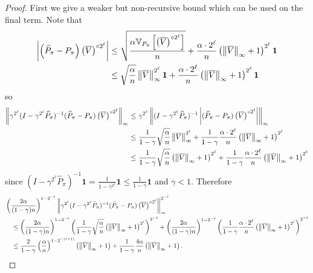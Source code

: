 \documentclass{article}
\theoremstyle{plain}
\theoremstyle{plain}
\theoremstyle{remark}
\theoremstyle{plain}
\theoremstyle{plain}
\newcommand{\Var}{\mathbb{V}}
\newcommand{\Phat}{\widehat{P}}
\newcommand{\one}{\mathbf{1}}
\newcommand{\Vc}{\overline{V}}
\begin{document}
\begin{proof}
    First we give a weaker but non-recursive bound which can be used on the final term. 
Note that
\begin{align*}
        \left| \left(\Phat_{\pi} - P_{\pi}\right) \left( \Vc \right)^{\circ 2^\ell} \right|
    &\leq \sqrt{\frac{\alpha   \Var_{P_{\pi}} \left[ \left(\Vc \right)^{\circ 2^\ell}  \right]    }{n }} + \frac{ \alpha \cdot 2^\ell }{n}  \left( \infnorm{\Vc} + 1\right)^{2^\ell}   \one \\
    & \leq \sqrt{\frac{\alpha}{n}} \infnorm{\Vc}^{2^\ell} \one  + \frac{ \alpha \cdot 2^\ell }{n}  \left( \infnorm{\Vc} + 1\right)^{2^\ell} \one 
    \end{align*}
    so
    \begin{align*}
        \infnorm{ \gamma^{2^\ell}(I - \gamma^{2^\ell} \Phat_{\pi})^{-1} (\Phat_{\pi} - P_\pi) \left( \Vc \right)^{\circ 2^\ell} } & \leq \gamma^{2^\ell} \infnorm{(I - \gamma^{2^\ell} \Phat_{\pi})^{-1} \left| (\Phat_{\pi} - P_\pi) \left( \Vc \right)^{\circ 2^\ell} \right|} \\
        & \leq \frac{1}{1-\gamma} \sqrt{\frac{\alpha}{n}} \infnorm{\Vc}^{2^\ell} + \frac{1}{1-\gamma} \frac{ \alpha \cdot 2^\ell }{n}  \left( \infnorm{\Vc} + 1\right)^{2^\ell} \\
        & \leq \frac{1}{1-\gamma} \sqrt{\frac{\alpha}{n}} \left( \infnorm{\Vc} + 1\right)^{2^\ell} + \frac{1}{1-\gamma} \frac{ \alpha \cdot 2^\ell }{n}  \left( \infnorm{\Vc} + 1\right)^{2^\ell}
    \end{align*}
    since $(I - \gamma^{2^\ell} \Phat_{\pi})^{-1} \one = \frac{1}{1-\gamma^{2^\ell}} \one \leq \frac{1}{1-\gamma} \one$ and $\gamma < 1$.
    Therefore
     \begin{align}
        &\left(\frac{2\alpha}{(1-\gamma)n}\right)^{1-2^{-\ell}}\infnorm{ \gamma^{2^\ell}(I - \gamma^{2^\ell} \Phat_{\pi})^{-1} (\Phat_{\pi} - P_\pi) \left( \Vc \right)^{\circ 2^\ell} }^{2^{-\ell}} \nonumber\\
        &\quad \leq \left(\frac{2\alpha}{(1-\gamma)n}\right)^{1-2^{-\ell}} \left( \frac{1}{1-\gamma} \sqrt{\frac{\alpha}{n}} \left( \infnorm{\Vc} + 1\right)^{2^\ell} \right)^{2^{-\ell}} + \left(\frac{2\alpha}{(1-\gamma)n}\right)^{1-2^{-\ell}} \left(  \frac{1}{1-\gamma} \frac{ \alpha \cdot 2^\ell }{n}  \left( \infnorm{\Vc} + 1\right)^{2^\ell} \right)^{2^{-\ell}} \nonumber \\
        & \quad \leq \frac{2}{1-\gamma} \left(\frac{\alpha}{n}\right)^{1-2^{-(\ell+1)}} \left( \infnorm{\Vc} + 1\right) + \frac{1}{1-\gamma}\frac{4 \alpha}{n} \left( \infnorm{\Vc} + 1\right). \label{eq:non_recursive_bound_final_term}
    \end{align}


\end{proof}
\end{document}
